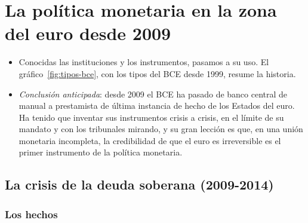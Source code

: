 \documentclass[11pt]{article}
\begin{document}
\section{La política monetaria en la zona del euro desde 2009}\label{sec:politica}

\begin{itemize}
\item Conocidas las instituciones y los instrumentos, pasamos a su uso. El gráfico~\ref{fig:tipos-bce}, con los tipos del BCE desde 1999, resume la historia.
\item \emph{Conclusión anticipada}: desde 2009 el BCE ha pasado de banco central de manual a prestamista de última instancia de hecho de los Estados del euro. Ha tenido que inventar sus instrumentos crisis a crisis, en el límite de su mandato y con los tribunales mirando, y su gran lección es que, en una unión monetaria incompleta, la credibilidad de que el euro es irreversible es el primer instrumento de la política monetaria.
\end{itemize}

\subsection{La crisis de la deuda soberana (2009-2014)}\label{sec:crisis-deuda}

\subsubsection{Los hechos}\label{sec:crisis-hechos}
\end{document}
